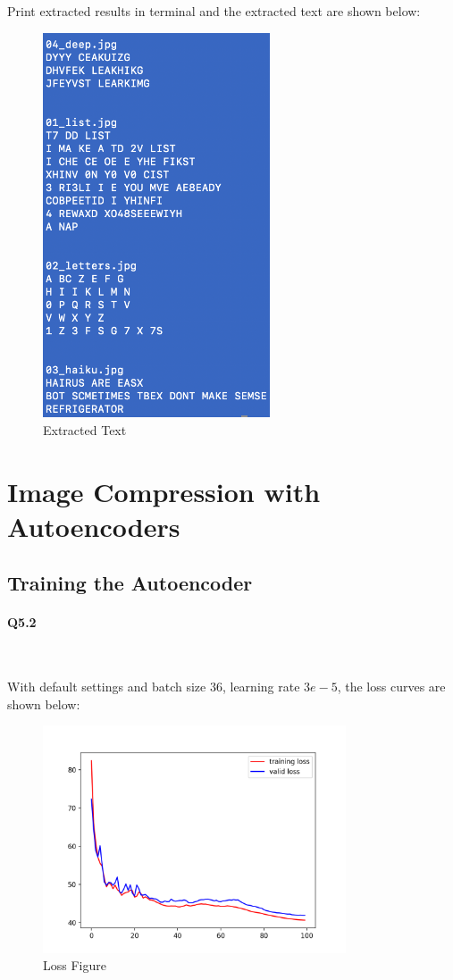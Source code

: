 \documentclass[11pt]{article} \usepackage{fullpage} \usepackage{graphicx} \usepackage{epstopdf} \usepackage{color} \usepackage{psfrag} \usepackage{pdfsync}\usepackage{indentfirst}\usepackage{subfigure}\usepackage{float}\usepackage[section]{placeins}
\begin{document}
Print extracted results in terminal and the extracted text are shown below:
\begin{figure}[H]
\centering
\includegraphics[width=0.6\textwidth]{results/q4_4.png}
\caption{Extracted Text}
\end{figure}

\section{Image Compression with Autoencoders}

\setcounter{subsection}{1}
\subsection{Training the Autoencoder}
\paragraph{Q5.2}~{}

With default settings and batch size $36$, learning rate $3e-5$, the loss curves are shown below:
\begin{figure}[H]
\centering
\includegraphics[width=0.8\textwidth]{results/q5_2_loss.png}
\caption{Loss Figure}
\end{figure}
\end{document}
